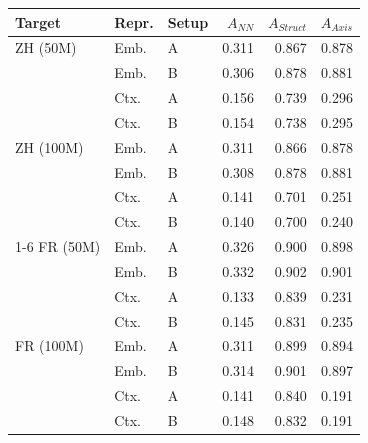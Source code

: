 \begin{tabular}{@{}lllrrr@{}}
\toprule
Target & Repr. & Setup & $A_{NN}$ & $A_{Struct}$ & $A_{Axis}$ \\
\midrule
ZH (50M) & Emb. & A & 0.311 & 0.867 & 0.878 \\
 & Emb. & B & 0.306 & 0.878 & 0.881 \\
 & Ctx. & A & 0.156 & 0.739 & 0.296 \\
 & Ctx. & B & 0.154 & 0.738 & 0.295 \\
ZH (100M) & Emb. & A & 0.311 & 0.866 & 0.878 \\
 & Emb. & B & 0.308 & 0.878 & 0.881 \\
 & Ctx. & A & 0.141 & 0.701 & 0.251 \\
 & Ctx. & B & 0.140 & 0.700 & 0.240 \\
\cmidrule(lr){1-6}
FR (50M) & Emb. & A & 0.326 & 0.900 & 0.898 \\
 & Emb. & B & 0.332 & 0.902 & 0.901 \\
 & Ctx. & A & 0.133 & 0.839 & 0.231 \\
 & Ctx. & B & 0.145 & 0.831 & 0.235 \\
FR (100M) & Emb. & A & 0.311 & 0.899 & 0.894 \\
 & Emb. & B & 0.314 & 0.901 & 0.897 \\
 & Ctx. & A & 0.141 & 0.840 & 0.191 \\
 & Ctx. & B & 0.148 & 0.832 & 0.191 \\
\bottomrule
\end{tabular}

